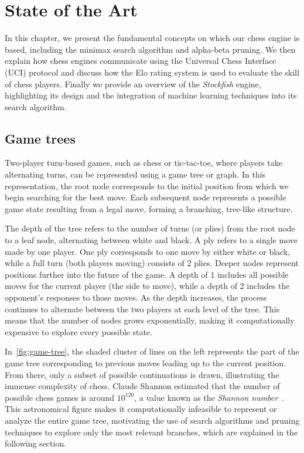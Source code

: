 \chapter{State of the Art}\label{cap:estadoDeLaCuestion}

In this chapter, we present the fundamental concepts on which our chess engine is based, including the minimax search algorithm and alpha-beta pruning. We then explain how chess engines communicate using the Universal Chess Interface (UCI) protocol and discuss how the Elo rating system is used to evaluate the skill of chess players. Finally we provide an overview of the \textit{Stockfish} engine, highlighting its design and the integration of machine learning techniques into its search algorithm.

\section{Game trees}

\par Two-player turn-based games, such as chess or tic-tac-toe, where players take alternating turns, can be represented using a game tree or graph. In this representation, the root node corresponds to the initial position from which we begin searching for the best move. Each subsequent node represents a possible game state resulting from a legal move, forming a branching, tree-like structure.

\vspace{1em}

\par The depth of the tree refers to the number of turns (or plies) from the root node to a leaf node, alternating between white and black. A ply refers to a single move made by one player. One ply corresponds to one move by either white or black, while a full turn (both players moving) consists of 2 plies. Deeper nodes represent positions further into the future of the game. A depth of 1 includes all possible moves for the current player (the side to move), while a depth of 2 includes the opponent's responses to those moves. As the depth increases, the process continues to alternate between the two players at each level of the tree. This means that the number of nodes grows exponentially, making it computationally expensive to explore every possible state.

\vspace{1em}

\noindent In~\cref{fig:game-tree}, the shaded cluster of lines on the left represents the part of the game tree corresponding to previous moves leading up to the current position. From there, only a subset of possible continuations is drawn, illustrating the immense complexity of chess. Claude Shannon estimated that the number of possible chess games is around $10^{120}$, a value known as the \textit{Shannon number}~\cite{Shannon1950}. This astronomical figure makes it computationally infeasible to represent or analyze the entire game tree, motivating the use of search algorithms and pruning techniques to explore only the most relevant branches, which are explained in the following section.


